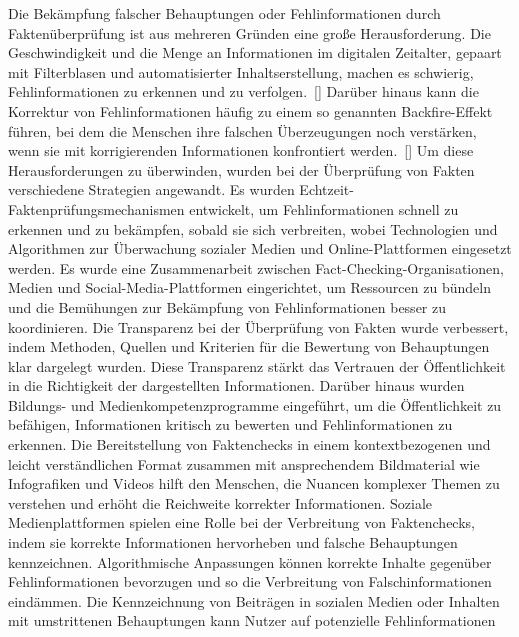 \documentclass[a4paper,listof=totoc,bibliography=totoc]{scrartcl}
\begin{document}
Die Bekämpfung falscher Behauptungen oder Fehlinformationen durch Faktenüberprüfung ist aus mehreren Gründen eine große Herausforderung. Die Geschwindigkeit und die 
Menge an Informationen im digitalen Zeitalter, gepaart mit Filterblasen und automatisierter Inhaltserstellung, machen es schwierig, Fehlinformationen zu erkennen und 
zu verfolgen.~[\cite{lewandowsky2020}] Darüber hinaus kann die Korrektur von Fehlinformationen häufig zu einem so genannten Backfire-Effekt führen, bei dem die 
Menschen ihre falschen Überzeugungen noch verstärken, wenn sie mit korrigierenden Informationen konfrontiert werden.~[\cite{nyhan2010}] Um diese Herausforderungen zu 
überwinden, wurden bei der Überprüfung von Fakten verschiedene Strategien angewandt. Es wurden Echtzeit-Faktenprüfungsmechanismen entwickelt, um Fehlinformationen 
schnell zu erkennen und zu bekämpfen, sobald sie sich verbreiten, wobei Technologien und Algorithmen zur Überwachung sozialer Medien und Online-Plattformen 
eingesetzt werden. Es wurde eine Zusammenarbeit zwischen Fact-Checking-Organisationen, Medien und Social-Media-Plattformen eingerichtet, um Ressourcen zu bündeln 
und die Bemühungen zur Bekämpfung von Fehlinformationen besser zu koordinieren.
\newline
\newline
Die Transparenz bei der Überprüfung von Fakten wurde verbessert, indem Methoden, Quellen und Kriterien für die Bewertung von Behauptungen klar dargelegt wurden. Diese 
Transparenz stärkt das Vertrauen der Öffentlichkeit in die Richtigkeit der dargestellten Informationen. Darüber hinaus wurden Bildungs- und Medienkompetenzprogramme eingeführt, 
um die Öffentlichkeit zu befähigen, Informationen kritisch zu bewerten und Fehlinformationen zu erkennen. Die Bereitstellung von Faktenchecks in einem kontextbezogenen 
und leicht verständlichen Format zusammen mit ansprechendem Bildmaterial wie Infografiken und Videos hilft den Menschen, die Nuancen komplexer Themen zu verstehen und 
erhöht die Reichweite korrekter Informationen. Soziale Medienplattformen spielen eine Rolle bei der Verbreitung von Faktenchecks, indem sie korrekte Informationen 
hervorheben und falsche Behauptungen kennzeichnen. Algorithmische Anpassungen können korrekte Inhalte gegenüber Fehlinformationen bevorzugen und so die Verbreitung von 
Falschinformationen eindämmen. 
\newline
\newline
Die Kennzeichnung von Beiträgen in sozialen Medien oder Inhalten mit umstrittenen Behauptungen kann Nutzer auf potenzielle Fehlinformationen 
\end{document}
